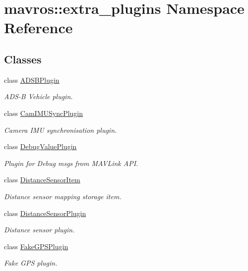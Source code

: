 \hypertarget{namespacemavros_1_1extra__plugins}{}\section{mavros\+::extra\+\_\+plugins Namespace Reference}
\label{namespacemavros_1_1extra__plugins}
\subsection*{Classes}
\begin{DoxyCompactItemize}
\item 
class \mbox{\hyperlink{classmavros_1_1extra__plugins_1_1ADSBPlugin}{A\+D\+S\+B\+Plugin}}
\begin{DoxyCompactList}\small\item\em A\+D\+S-\/B Vehicle plugin. \end{DoxyCompactList}\item 
class \mbox{\hyperlink{classmavros_1_1extra__plugins_1_1CamIMUSyncPlugin}{Cam\+I\+M\+U\+Sync\+Plugin}}
\begin{DoxyCompactList}\small\item\em Camera I\+MU synchronisation plugin. \end{DoxyCompactList}\item 
class \mbox{\hyperlink{classmavros_1_1extra__plugins_1_1DebugValuePlugin}{Debug\+Value\+Plugin}}
\begin{DoxyCompactList}\small\item\em Plugin for Debug msgs from M\+A\+V\+Link A\+PI. \end{DoxyCompactList}\item 
class \mbox{\hyperlink{classmavros_1_1extra__plugins_1_1DistanceSensorItem}{Distance\+Sensor\+Item}}
\begin{DoxyCompactList}\small\item\em Distance sensor mapping storage item. \end{DoxyCompactList}\item 
class \mbox{\hyperlink{classmavros_1_1extra__plugins_1_1DistanceSensorPlugin}{Distance\+Sensor\+Plugin}}
\begin{DoxyCompactList}\small\item\em Distance sensor plugin. \end{DoxyCompactList}\item 
class \mbox{\hyperlink{classmavros_1_1extra__plugins_1_1FakeGPSPlugin}{Fake\+G\+P\+S\+Plugin}}
\begin{DoxyCompactList}\small\item\em Fake G\+PS plugin. \end{DoxyCompactList}\item 

\end{DoxyCompactItemize}
